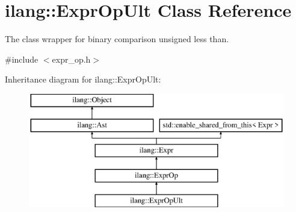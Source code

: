 \hypertarget{classilang_1_1_expr_op_ult}{}\section{ilang\+:\+:Expr\+Op\+Ult Class Reference}
\label{classilang_1_1_expr_op_ult}


The class wrapper for binary comparison unsigned less than.  




{\ttfamily \#include $<$expr\+\_\+op.\+h$>$}

Inheritance diagram for ilang\+:\+:Expr\+Op\+Ult\+:\begin{figure}[H]
\begin{center}
\leavevmode
\includegraphics[height=5.000000cm]{classilang_1_1_expr_op_ult}
\end{center}
\end{figure}
